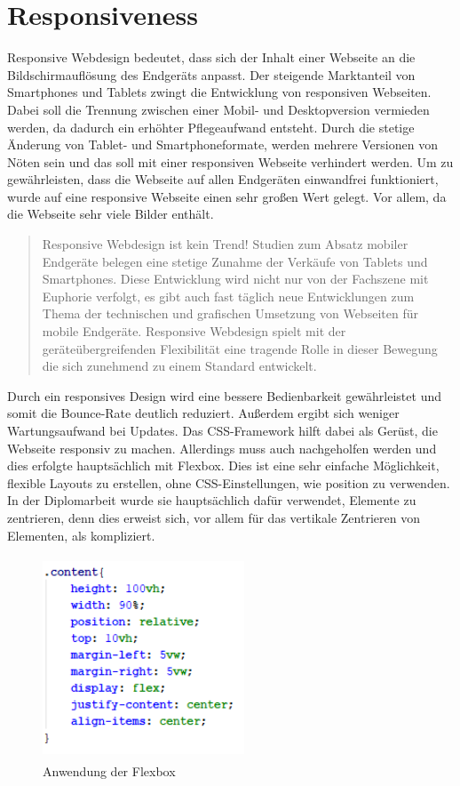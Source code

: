 \section{Responsiveness}
Responsive Webdesign bedeutet, dass sich der Inhalt einer Webseite an die Bildschirmauflösung des Endgeräts anpasst. Der steigende Marktanteil von Smartphones und Tablets zwingt die Entwicklung von responsiven Webseiten. Dabei soll die Trennung zwischen einer Mobil- und Desktopversion vermieden werden, da dadurch ein erhöhter Pflegeaufwand entsteht. Durch die stetige Änderung von Tablet- und Smartphoneformate, werden mehrere Versionen von Nöten sein und das soll mit einer responsiven Webseite verhindert werden. 
Um zu gewährleisten, dass die Webseite auf allen Endgeräten einwandfrei funktioniert, wurde auf eine responsive Webseite einen sehr großen Wert gelegt. Vor allem, da die Webseite sehr viele Bilder enthält.
\begin{quote}
Responsive Webdesign ist kein Trend! Studien zum Absatz mobiler Endgeräte belegen eine stetige Zunahme der Verkäufe von Tablets und Smartphones. Diese Entwicklung wird nicht nur von der Fachszene mit Euphorie verfolgt, es gibt auch fast täglich neue Entwicklungen zum Thema der technischen und grafischen Umsetzung von Webseiten für mobile Endgeräte. Responsive Webdesign spielt mit der geräteübergreifenden Flexibilität eine tragende Rolle in dieser Bewegung die sich zunehmend zu einem Standard entwickelt.
\end{quote}
Durch ein responsives Design wird eine bessere Bedienbarkeit gewährleistet und somit die Bounce-Rate deutlich reduziert. Außerdem ergibt sich weniger Wartungsaufwand bei Updates.  Das CSS-Framework hilft dabei als Gerüst, die Webseite responsiv zu machen. Allerdings muss auch nachgeholfen werden und dies erfolgte hauptsächlich mit Flexbox. Dies ist eine sehr einfache Möglichkeit, flexible Layouts zu erstellen, ohne CSS-Einstellungen, wie position zu verwenden. In der Diplomarbeit wurde sie hauptsächlich dafür verwendet, Elemente zu zentrieren, denn dies erweist sich, vor allem für das vertikale Zentrieren von Elementen, als kompliziert.
 \begin{figure}[H]
	\centering				\includegraphics[width=6cm,height=6cm,keepaspectratio]{webseite_abb3} 
	\caption{Anwendung der Flexbox}
\end{figure} 
